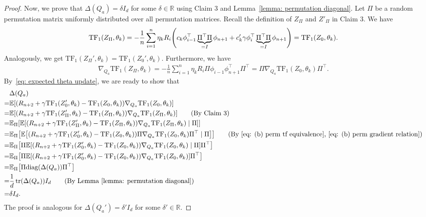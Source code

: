 \documentclass{article}
\newcommand{\explain}[1]{\tag*{(#1)}}
\newcommand{\R}{\mathbb{R}}
\newcommand{\E}{\mathbb{E}}
\newcommand{\tf}{\text{TF}}
\newcommand{\diag}{\text{diag}}
\begin{document}
\begin{proof}
Now, we prove that $\Delta(Q_a) = \delta I_d$ for some $\delta \in \R$ using Claim 3 and Lemma~\ref{lemma: permutation diagonal}.
Let $\Pi$ be a random permutation matrix uniformly distributed over all permutation matrices.
Recall the definition of $Z_\Pi$ and $Z'_\Pi$ in Claim 3.
We have
\begin{align}
\label{eq: (b) perm tf equivalence}
    \tf_1(Z_\Pi,\theta_k) = -\frac{1}{n}\sum_{i=1}^n  \eta_k R_i \qty(c_k \phi_{i-1}^\top \underbrace{\Pi^\top \Pi}_{= I} \phi_{n+1} + c'_k \gamma \phi_i^\top \underbrace{\Pi^\top \Pi}_{= I} \phi_{n+1}) 
    = \tf_1(Z_0,\theta_k).
\end{align}
Analogously, we get $\tf_1(Z_\Pi', \theta_k) = \tf_1(Z_0', \theta_k)$.
Furthermore, we have
\begin{align}
\label{eq: (b) perm gradient relation}
    \nabla_{Q_a} \tf_1(Z_\Pi, \theta_k) = -\frac{1}{n}\sum_{i=1}^n \eta_k R_i  \Pi \phi_{i-1} \phi_{n+1}^\top \Pi^\top
    = \Pi \nabla_{Q_a} \tf_1(Z_0, \theta_k) \Pi^\top.
\end{align}
By~\eqref{eq: expected theta update}, we are ready to show that
\begin{align}
    & \Delta(Q_a)\\
    =& \E\qty[(R_{n+2} + \gamma \tf_1(Z'_0, \theta_k) - \tf_1(Z_0, \theta_k))\nabla_{Q_a}\tf_1(Z_0, \theta_k)]\\
    =& \E\qty[(R_{n+2} + \gamma \tf_1(Z'_\Pi, \theta_k) - \tf_1(Z_\Pi, \theta_k))\nabla_{Q_a}\tf_1(Z_\Pi, \theta_k)]\explain{By Claim 3}\\
    =& \E_{\Pi} \qty[\E\qty[(R_{n+2} + \gamma \tf_1(Z'_\Pi, \theta_k) - \tf_1(Z_\Pi, \theta_k))\nabla_{Q_a}\tf_1(Z_\Pi, \theta_k) \mid \Pi]]\\
    =& \E_{\Pi} \qty[\E\qty[(R_{n+2} + \gamma \tf_1(Z'_0, \theta_k) - \tf_1(Z_0, \theta_k))\Pi \nabla_{Q_a}\tf_1(Z_0, \theta_k) \Pi^\top\mid \Pi]]\explain{By \eqref{eq: (b) perm tf equivalence}, \eqref{eq: (b) perm gradient relation}}\\
    =& \E_{\Pi} \qty[\Pi \E\qty[(R_{n+2} + \gamma \tf_1(Z'_0, \theta_k) - \tf_1(Z_0, \theta_k))\nabla_{Q_a}\tf_1(Z_0, \theta_k) \mid \Pi]\Pi^\top]\\
    =& \E_{\Pi} \qty[\Pi \E\qty[(R_{n+2} + \gamma \tf_1(Z'_0, \theta_k) - \tf_1(Z_0, \theta_k))\nabla_{Q_a}\tf_1(Z_0, \theta_k)]\Pi^\top]\\
    =& \E_{\Pi} \qty[\Pi \diag\qty(\Delta(Q_a))\Pi^\top] \\
    =& \frac{1}{d}\tr(\Delta(Q_a))I_d\explain{By Lemma~\ref{lemma: permutation diagonal}}\\
    =& \delta I_d.
\end{align}
The proof is analogous for $\Delta(Q_a') = \delta'I_d$ for some $\delta' \in \R$.


\end{proof}
\end{document}
